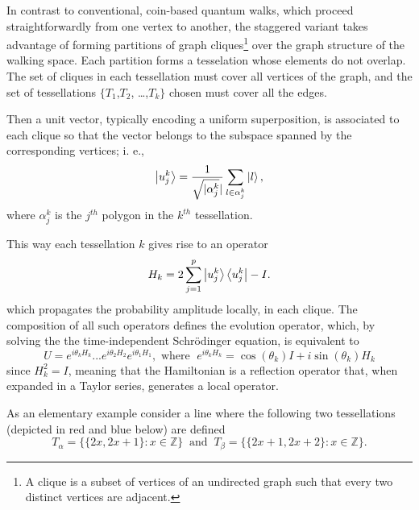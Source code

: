 In contrast to conventional, coin-based quantum walks, which proceed straightforwardly from one vertex to another, the staggered variant  \cite{PortugalSFG16} takes advantage of forming partitions of graph cliques\footnote{A clique is a subset of vertices of an
undirected graph such that every two distinct vertices are adjacent.} over the graph structure of the walking space. Each partition forms a tesselation whose elements do not overlap. The set of
cliques in each tessellation must cover all vertices of the graph, and the set
of tessellations $\{T_{1}$,$T_{2}$, \ldots ,$T_{k}\}$ chosen
must cover all the edges.

Then  a unit vector, typically encoding a uniform
superposition, is associated to each clique so that
the vector belongs to the subspace spanned by the corresponding vertices; i. e., 
\begin{equation}
	\ket{u_{j}^{k}} = \frac{1}{\sqrt{\mathopen|\alpha_{j}^{k}}\mathclose|}\sum_{l\in\alpha_{j}^{k}}\ket{l},
\end{equation}
where $\alpha_{j}^{k}$ is the $j^{th}$ polygon in the $k^{th}$ tessellation.

This way each tessellation $k$ gives rise to an operator 
\begin{equation}
	H_k = 2\sum_{j=1}^{p}\ket{u_{j}^{k}}\bra{u_{j}^{k}} - I.
	\label{eq:StagHamil}
\end{equation}
which propagates the probability amplitude locally, in each clique.
The composition of all such operators defines the evolution operator, which, by solving the 
the time-independent Schr\"odinger equation, is equivalent to 
\begin{equation}
	U = e^{i\theta_{k}H_{k}}...e^{i\theta_{2}H_{2}}e^{i\theta_{1}H_{1}}, \text{  where  }\; e^{i\theta_{k}H_{k}} = \cos{(\theta_k)}I + i\sin{(\theta_k)}H_k
	\label{eq:stagWalkUnmodOp}
\end{equation}
since $H_k^2 = I$, meaning that the Hamiltonian is a reflection operator that,
when expanded in a Taylor series, generates a local operator.

As an elementary example consider a line where the following two tessellations  (depicted in red and blue below) are defined 
\begin{equation}
	T_{\alpha}= \{\{2x,2x+1\}\colon x \in \mathbb{Z}\}\; \; \text{and}\; \; T_{\beta}= \{\{2x+1,2x+2\}\colon x \in \mathbb{Z}\}.
\end{equation}

